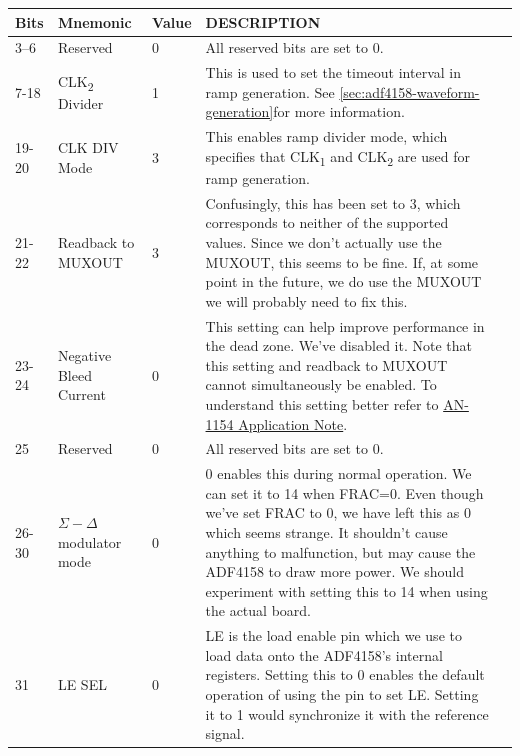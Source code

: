 \label{tab:adf4158-reg-map-4}
\begin{tabularx}{\textwidth}{l l l X>{\raggedright\arraybackslash}X}
  \caption{TEST REGISTER(R4) MAP} \\
  \toprule
  \textbf{Bits} & \textbf{Mnemonic} & \textbf{Value} & \textbf{DESCRIPTION} \\
  \midrule

  \endhead{}

  3--6 & Reserved & 0 & All reserved bits are set to 0. \\
  7-18 & CLK\textsubscript{2} Divider & 1 & This is used to set the timeout interval in ramp
                                            generation. See
                                            \cref{sec:adf4158-waveform-generation}for more
                                            information. \\
  19-20 & CLK DIV Mode & 3 & This enables ramp divider mode, which specifies that
                             CLK\textsubscript{1} and CLK\textsubscript{2} are used for ramp
                             generation. \\
  21-22 & Readback to MUXOUT & 3 & Confusingly, this has been set to 3, which corresponds to neither
  of the supported values. Since we don't actually use the MUXOUT, this seems to be fine. If, at
                                   some point in the future, we do use the MUXOUT we will probably
                                   need to fix this. \\
  23-24 & Negative Bleed Current & 0 & This setting can help improve performance in the dead
                                       zone. We've disabled it. Note that this setting and readback
                                       to MUXOUT cannot simultaneously be enabled. To understand
                                       this setting better refer to \href{http://www.analog.com/media/en/technical-documentation/application-notes/AN-1154.pdf?doc=ADF4158.pdf}{AN-1154
                                       Application Note}. \\
  25 & Reserved & 0 & All reserved bits are set to 0. \\
  26-30 & $\Sigma-\Delta$ modulator mode & 0 & 0 enables this during normal operation. We can set it
                                               to 14 when FRAC=0. Even though we've set FRAC to 0,
                                               we have left this as 0 which seems strange. It
                                               shouldn't cause anything to malfunction, but may
                                               cause the ADF4158 to draw more power. We should
                                               experiment with setting this to 14 when using the
                                               actual board. \\
  31 & LE SEL & 0 & LE is the load enable pin which we use to load data onto the ADF4158's internal
                    registers. Setting this to 0 enables the default operation of using the pin to
                    set LE. Setting it to 1 would synchronize it with the reference signal. \\

  \bottomrule
\end{tabularx}

